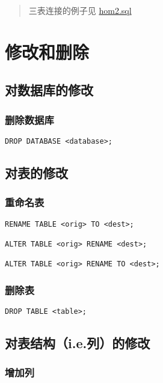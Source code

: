 \documentclass[a4paper, twoside]{article}
\begin{document}
\begin{quote}
三表连接的例子见 \href{../cs9/hom2.sql}{hom2.sql}
\end{quote}

\section{修改和删除}

\subsection{对数据库的修改}

\subsubsection{删除数据库}

\begin{verbatim}
DROP DATABASE <database>;
\end{verbatim}

\subsection{对表的修改}

\subsubsection{重命名表}

\begin{verbatim}
RENAME TABLE <orig> TO <dest>;

ALTER TABLE <orig> RENAME <dest>;

ALTER TABLE <orig> RENAME TO <dest>;
\end{verbatim}

\subsubsection{删除表}

\begin{verbatim}
DROP TABLE <table>;
\end{verbatim}

\subsection{对表结构（i.e.列）的修改}

\subsubsection{增加列}
\end{document}

